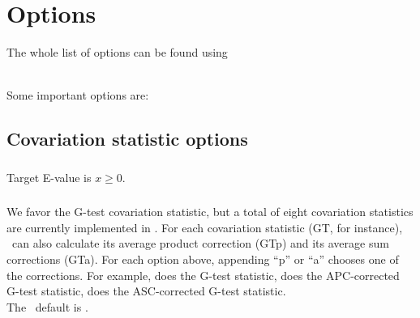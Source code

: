 \clearpage
\section{Options}
\label{section:options}
\setcounter{footnote}{0}

The whole list of options can be found using 

\\

Some important options are:
\subsection{Covariation statistic options}

\subsubsection{}  Target E-value is $x\geq 0$.

\subsubsection{}
We favor the G-test covariation statistic, but a total of eight
covariation statistics are currently implemented in \rscape. For each
covariation statistic (GT, for instance), \rscape\ can also calculate
its average product correction (GTp) and its average sum corrections
(GTa). For each option above, appending ``p'' or ``a'' chooses one of the
corrections. For example,  does the G-test statistic,
 does the APC-corrected G-test statistic, 
does the ASC-corrected G-test statistic.\\

The \rscape\ default is .\\


